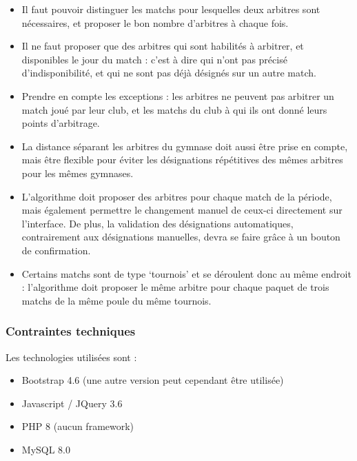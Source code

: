 \begin{itemize}
    \item Il faut pouvoir distinguer les matchs pour lesquelles deux arbitres sont nécessaires, et proposer le bon nombre d’arbitres à chaque fois. 
    \item Il ne faut proposer que des arbitres qui sont habilités à arbitrer, et disponibles le jour du match : c’est à dire qui n’ont pas précisé d’indisponibilité, et qui ne sont pas déjà désignés sur un autre match. 
    \item Prendre en compte les exceptions : les arbitres ne peuvent pas arbitrer un match joué par leur club, et les matchs du club à qui ils ont donné leurs points d’arbitrage.
    \item La distance séparant les arbitres du gymnase doit aussi être prise en compte, mais être flexible pour éviter les désignations répétitives des mêmes arbitres pour les mêmes gymnases.
    \item L’algorithme doit proposer des arbitres pour chaque match de la période, mais également permettre le changement manuel de ceux-ci directement sur l’interface. De plus, la validation des désignations automatiques, contrairement aux désignations manuelles, devra se faire grâce à un bouton de confirmation.
    \item Certains matchs sont de type ‘tournois’ et se déroulent donc au même endroit : l’algorithme doit proposer le même arbitre pour chaque paquet de trois matchs de la même poule du même tournois.
\end{itemize}


\subsubsection{Contraintes techniques}

Les technologies utilisées sont :\\

\begin{itemize}
    \item Bootstrap 4.6 (une autre version peut cependant être utilisée)
    \item Javascript / JQuery 3.6
    \item PHP 8 (aucun framework)
    \item MySQL 8.0
\end{itemize}
